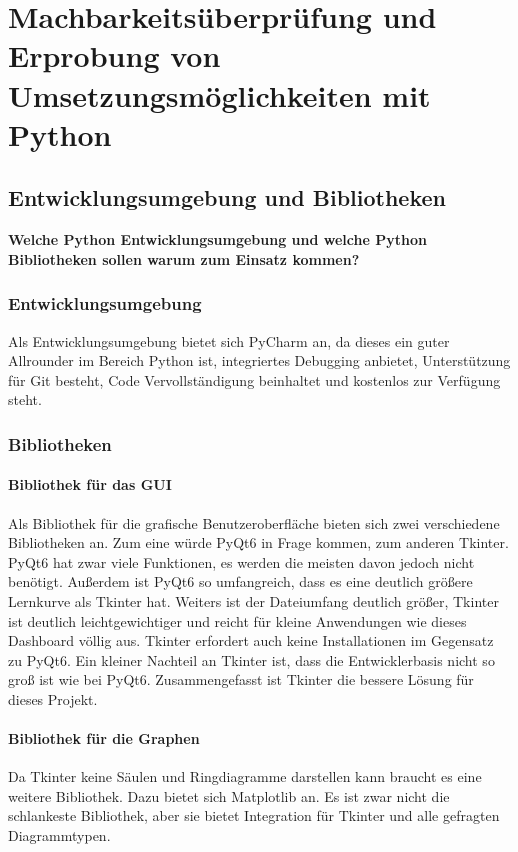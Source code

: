 \section{Machbarkeitsüberprüfung und Erprobung von Umsetzungsmöglichkeiten mit Python}
\subsection{Entwicklungsumgebung und Bibliotheken}

\textbf{Welche Python Entwicklungsumgebung und welche Python Bibliotheken sollen warum zum Einsatz kommen?}
\subsubsection{Entwicklungsumgebung}
Als Entwicklungsumgebung bietet sich PyCharm an, da dieses ein guter Allrounder im Bereich Python ist, integriertes Debugging anbietet, Unterstützung für Git besteht, Code Vervollständigung beinhaltet und kostenlos zur Verfügung steht.
\subsubsection{Bibliotheken}
\paragraph{Bibliothek für das GUI}
Als Bibliothek für die grafische Benutzeroberfläche bieten sich zwei verschiedene Bibliotheken an. Zum eine würde PyQt6 in Frage kommen, zum anderen Tkinter. PyQt6 hat zwar viele Funktionen, es werden die meisten davon jedoch nicht benötigt. Außerdem ist PyQt6 so umfangreich, dass es eine deutlich größere Lernkurve als Tkinter hat. Weiters ist der Dateiumfang deutlich größer, Tkinter ist deutlich leichtgewichtiger und reicht für kleine Anwendungen wie dieses Dashboard völlig aus. Tkinter erfordert auch keine Installationen im Gegensatz zu PyQt6. Ein kleiner Nachteil an Tkinter ist, dass die Entwicklerbasis nicht so groß ist wie bei PyQt6. Zusammengefasst ist Tkinter die bessere Lösung für dieses Projekt.
\paragraph{Bibliothek für die Graphen}

Da Tkinter keine Säulen und Ringdiagramme darstellen kann braucht es eine weitere Bibliothek. Dazu bietet sich Matplotlib an. Es ist zwar nicht die schlankeste Bibliothek, aber sie bietet Integration für Tkinter und alle gefragten Diagrammtypen.

